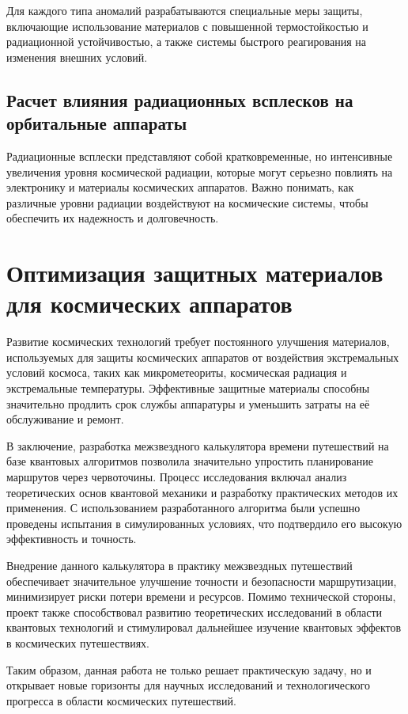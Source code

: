 \documentclass[]{../vvsu}
\begin{document}
Для каждого типа аномалий разрабатываются специальные меры защиты, включающие использование материалов с повышенной термостойкостью и радиационной устойчивостью, а также системы быстрого реагирования на изменения внешних условий.

\subsection{Расчет влияния радиационных всплесков на орбитальные аппараты}

Радиационные всплески представляют собой кратковременные, но интенсивные увеличения уровня космической радиации, которые могут серьезно повлиять на электронику и материалы космических аппаратов. Важно понимать, как различные уровни радиации воздействуют на космические системы, чтобы обеспечить их надежность и долговечность.

\pagebreak
\section{Оптимизация защитных материалов для космических аппаратов}

Развитие космических технологий требует постоянного улучшения материалов, используемых для защиты космических аппаратов от воздействия экстремальных условий космоса, таких как микрометеориты, космическая радиация и экстремальные температуры. Эффективные защитные материалы способны значительно продлить срок службы аппаратуры и уменьшить затраты на её обслуживание и ремонт.

\clearpage
\begin{conclusion}
  В заключение, разработка межзвездного калькулятора времени путешествий на базе квантовых алгоритмов позволила значительно упростить планирование маршрутов через червоточины. Процесс исследования включал анализ теоретических основ квантовой механики и разработку практических методов их применения. С использованием разработанного алгоритма были успешно проведены испытания в симулированных условиях, что подтвердило его высокую эффективность и точность.

  Внедрение данного калькулятора в практику межзвездных путешествий обеспечивает значительное улучшение точности и безопасности маршрутизации, минимизирует риски потери времени и ресурсов. Помимо технической стороны, проект также способствовал развитию теоретических исследований в области квантовых технологий и стимулировал дальнейшее изучение квантовых эффектов в космических путешествиях.

  Таким образом, данная работа не только решает практическую задачу, но и открывает новые горизонты для научных исследований и технологического прогресса в области космических путешествий.
\end{conclusion}

\end{document}
